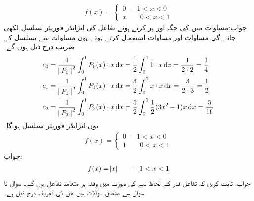 \begin{align*}
f(x)=
\begin{cases}
0 & -1<x<0\\
x& \phantom{-}0<x<1
\end{cases}
\end{align*}
جواب:مساوات  میں  کی جگہ  اور  پر کرتے ہوئے تفاعل  کی لیژانڈر فوریئر تسلسل  لکھی جائے گی۔مساوات  اور مساوات  استعمال کرتے ہوئے  یوں مساوات  سے تسلسل کے  ضریب  درج ذیل ہوں گے۔
\begin{align*}
c_0&=\frac{1}{\norm{P_0}^2}\int_{0}^{1} P_0(x) \cdot x \dif x=\frac{1}{2}\int_{0}^{1} 1 \cdot x \dif x=\frac{1}{2\cdot 2}=\frac{1}{4}\\
c_1&=\frac{1}{\norm{P_1}^2}\int_0^1 P_1(x)\cdot x \dif x=\frac{3}{2}\int_0^1 x\cdot x \dif x=\frac{3}{2\cdot 3}=\frac{1}{2}\\
c_2&=\frac{1}{\norm{P_2}^2}\int_0^1 P_2(x)\cdot x \dif x=\frac{5}{2}\int_0^1 \frac{1}{2}(3x^2-1)x\dif x=\frac{5}{16}
\end{align*}
یوں لیژانڈر فوریئر تسلسل  ہو گا۔
\quad
\begin{align*}
f(x)=
\begin{cases}
0& -1<x<0\\
1&\phantom{-}0<x<1
\end{cases}
\end{align*}
جواب:
\begin{align*}
f(x)=\abs{x} \quad\quad  -1<x<1
\end{align*}
جواب:
ثابت کریں کہ تفاعل قدر  کے لحاظ سے   کی صورت میں  وقفہ  پر  متعامد  تفاعل ہوں گے۔
سوال  تا سوال    سے متعلق سوالات ہیں جن کی تعریف درج ذیل ہے۔
